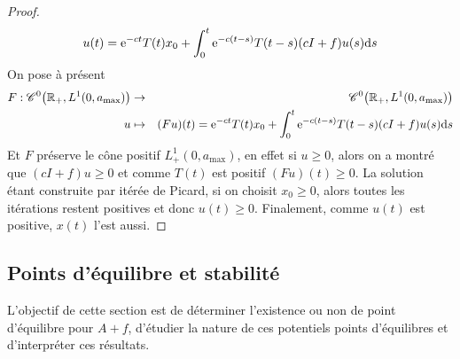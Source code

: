 \begin{proof}
\begin{equation*}
        u(t) = \mathrm{e}^{-ct}T(t)x_0 + \int_0^t \mathrm{e}^{-c(t-s)}T(t-s)(cI+f)u(s)\mathrm{d} s
    \end{equation*}
    On pose à présent 
    \begin{eqnarray*}
        F : \mathscr{C}^0\big(\mathbb{R}_+,L^1(0,a_{\max})\big) &\rightarrow& \mathscr{C}^0\big(\mathbb{R}_+,L^1(0,a_{\max})\big) \\
        u &\mapsto& (Fu)(t)=\mathrm{e}^{-ct}T(t)x_0 + \int_0^t \mathrm{e}^{-c(t-s)}T(t-s)(cI+f)u(s)\mathrm{d} s
    \end{eqnarray*}
    Et $F$ préserve le cône positif $L^1_+(0,a_{\max})$, en effet si $u \geq 0$, alors on a montré que $(cI+f)u \geq 0$ et comme $T(t)$ est positif $(Fu)(t) \geq 0$. La solution étant construite par itérée de Picard, si on choisit $x_0 \geq 0$, alors toutes les itérations restent positives et donc $u(t) \geq 0$. Finalement, comme $u(t)$ est positive, $x(t)$ l'est aussi.
\end{proof}

\subsection{Points d'équilibre et stabilité}
L'objectif de cette section est de déterminer l'existence ou non de point d'équilibre pour $A+f$, d'étudier la nature de ces potentiels points d'équilibres et d'interpréter ces résultats.
